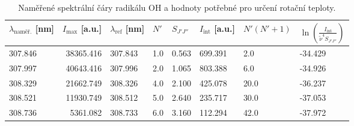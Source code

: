 \documentclass[czech,11pt,a4paper]{article}
\begin{document}
			\begin{table}[H]
				\centering
				\caption{Naměřené spektrální čáry radikálu OH a hodnoty potřebné pro určení rotační teploty.}
				\label{tab:oh_spektrum}
				\begin{tabular}{lrllllll}

					$\lambda_\mathrm{naměř.}$ [nm] &
					$I_\mathrm{max}$ [a.u.] &
					$\lambda_\mathrm{ref}$ [nm] &
					$N'$ &
					$S_{J'J''}$ &
					$I_\mathrm{int}$ [a.u.] &
					$N'(N'+1)$ &
					$\ln \left(\frac{I_\mathrm{int}}{\tilde\nu^4 S_{J'J''}}\right)$ \\
					\hline

					307.846 & 38365.416 & 307.843 & 1.0 & 0.563 & 699.391 & 2.0 & -34.429 \\
					307.997 & 40643.416 & 307.996 & 2.0 & 1.065 & 803.388 & 6.0 & -34.926 \\
					308.329 & 21662.749 & 308.326 & 4.0 & 2.100 & 425.078 & 20.0 & -36.237 \\
					308.521 & 11930.749 & 308.512 & 5.0 & 2.640 & 235.717 & 30.0 & -37.053 \\
					308.736 &  5361.082 & 308.733 & 6.0 & 3.160 & 112.294 & 42.0 & -37.972 \\

				\end{tabular}
			\end{table}
			
		
		
\end{document}
